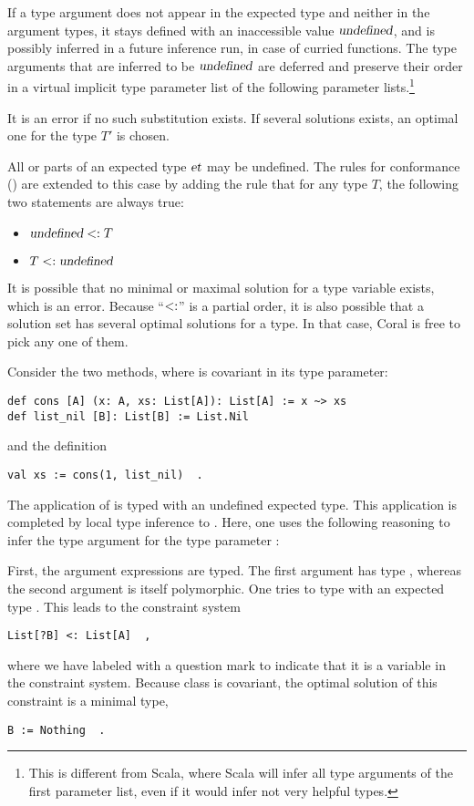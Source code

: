 If a type argument does not appear in the expected type and neither in the argument types, it stays defined with an inaccessible value $\mbox{\sl undefined}$, and is possibly inferred in a future inference run, in case of curried functions. The type arguments that are inferred to be $\mbox{\sl undefined}$ are deferred and preserve their order in a virtual implicit type parameter list of the following parameter lists.\footnote{This is different from Scala, where Scala will infer all type arguments of the first parameter list, even if it would infer not very helpful types.}

It is an error if no such substitution exists. If several solutions exists, an optimal one for the type $T'$ is chosen. 

All or parts of an expected type $\mbox{\sl et}$ may be undefined. The rules for conformance () are extended to this case by adding the rule that for any type $T$, the following two statements are always true:
\begin{itemize}
\item $\mbox{\sl undefined} <: T$
\item $T <: \mbox{\sl undefined}$
\end{itemize}

It is possible that no minimal or maximal solution for a type variable exists, which is an error. Because ``$<:$'' is a partial order, it is also possible that a solution set has several optimal solutions for a type. In that case, Coral is free to pick any one of them. 

\example Consider the two methods, where  is covariant in its type parameter:
\begin{lstlisting}
def cons [A] (x: A, xs: List[A]): List[A] := x ~> xs
def list_nil [B]: List[B] := List.Nil
\end{lstlisting}
and the definition
\begin{lstlisting}
val xs := cons(1, list_nil)  .
\end{lstlisting}

The application of  is typed with an undefined expected type. This application is completed by local type inference to . Here, one uses the following reasoning to infer the type argument  for the type parameter :

First, the argument expressions are typed. The first argument  has type , whereas the second argument  is itself polymorphic. One tries to type  with an expected type . This leads to the constraint system
\begin{lstlisting}
List[?B] <: List[A]  ,
\end{lstlisting}
where we have labeled  with a question mark to indicate that it is a variable in the constraint system. Because class  is covariant, the optimal solution of this constraint is a minimal type, 
\begin{lstlisting}
B := Nothing  .
\end{lstlisting}

